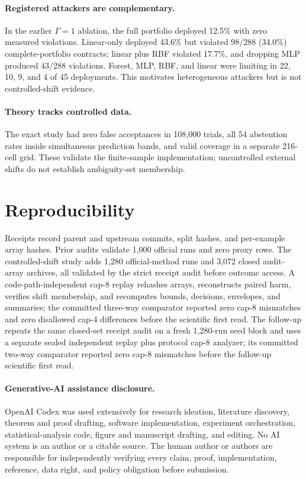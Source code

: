 \paragraph{Registered attackers are complementary.}
In the earlier $\Gamma=1$ ablation, the full portfolio deployed 12.5\% with zero
measured violations. Linear-only deployed 43.6\% but violated 98/288 (34.0\%)
complete-portfolio contracts; linear plus RBF violated 17.7\%, and dropping MLP
produced 43/288 violations. Forest, MLP, RBF, and linear were limiting in 22,
10, 9, and 4 of 45 deployments. This motivates heterogeneous attackers but is
not controlled-shift evidence.

\paragraph{Theory tracks controlled data.}
The exact study had zero false acceptances in 108,000 trials, all 54 abstention
rates inside simultaneous prediction bands, and valid coverage in a separate
216-cell grid. These validate the finite-sample implementation; uncontrolled
external shifts do not establish ambiguity-set membership.

\section{Reproducibility}

\CodeAvailabilityText{} Receipts record parent and upstream commits, split
hashes, and per-example array hashes. Prior audits validate 1,000 official runs
and zero proxy rows. The controlled-shift study adds 1,280 official-method
runs and 3,072 closed audit-array archives, all validated by the strict receipt
audit before outcome access. A code-path-independent cap-8 replay rehashes
arrays, reconstructs paired harm, verifies shift membership, and recomputes
bounds, decisions, envelopes, and summaries; the committed three-way comparator
reported zero cap-8 mismatches and zero disallowed cap-4 differences before
the scientific first read. The follow-up repeats the same closed-set receipt
audit on a fresh 1,280-run seed block and uses a separate sealed independent
replay plus protocol cap-8 analyzer; its committed two-way comparator reported
zero cap-8 mismatches before the follow-up scientific first read.

\paragraph{Generative-AI assistance disclosure.}
OpenAI Codex was used extensively for research ideation, literature discovery,
theorem and proof drafting, software implementation, experiment orchestration,
statistical-analysis code, figure and manuscript drafting, and editing. No AI
system is an author or a citable source. The human author or authors are
responsible for independently verifying every claim, proof, implementation,
reference, data right, and policy obligation before submission.

